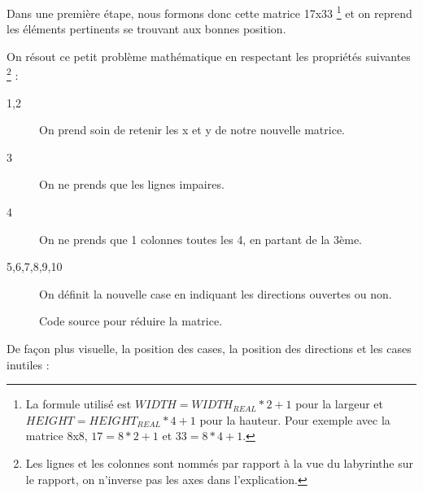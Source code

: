 Dans une première étape, nous formons donc cette matrice 17x33 \footnote{La formule utilisé est $WIDTH = WIDTH_{REAL}*2+1$ pour la largeur et $HEIGHT = HEIGHT_{REAL}*4+1$ pour la hauteur. Pour exemple avec la matrice 8x8, $17=8*2+1$ et $33=8*4+1$.} et on reprend les éléments pertinents se trouvant aux bonnes position.

On résout ce petit problème mathématique en respectant les propriétés suivantes \footnote{Les lignes et les colonnes sont nommés par rapport à la vue du labyrinthe sur le rapport, on n'inverse pas les axes dans l'explication.} :
\begin{description}
    \item [1,2] On prend soin de retenir les x et y de notre nouvelle matrice.
	\item [3] On ne prends que les lignes impaires.
    \item [4] On ne prends que 1 colonnes toutes les 4, en partant de la 3ème.
    \item [5,6,7,8,9,10] On définit la nouvelle case en indiquant les directions ouvertes ou non.
\end{description}




\begin{figure}[!h]
\centering

\caption{Code source pour réduire la matrice.}
\end{figure}



De façon plus visuelle, \textcolor{c_c}{la position des cases}, \textcolor{c_d}{la position des directions} et \textcolor{c_n}{les cases inutiles} :



